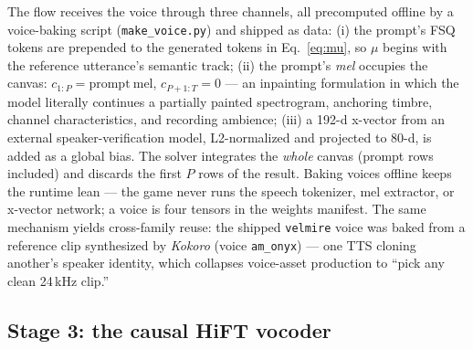 \documentclass[11pt,a4paper]{article}
\newcommand{\code}[1]{\texttt{#1}}
\begin{document}
The flow receives the voice through three channels, all precomputed offline by a
voice-baking script (\code{make\_voice.py}) and shipped as data: (i) the prompt's FSQ
tokens are prepended to the generated tokens in Eq.~\eqref{eq:mu}, so $\mu$ begins with
the reference utterance's semantic track; (ii) the prompt's \emph{mel} occupies the
canvas: $c_{1:P} = \mathrm{prompt\ mel}$, $c_{P+1:T} = 0$ --- an inpainting formulation
in which the model literally continues a partially painted spectrogram, anchoring
timbre, channel characteristics, and recording ambience; (iii) a 192-d x-vector from an
external speaker-verification model, L2-normalized and projected to 80-d, is added as a
global bias. The solver integrates the \emph{whole} canvas (prompt rows included) and
discards the first $P$ rows of the result. Baking voices offline keeps the runtime lean
--- the game never runs the speech tokenizer, mel extractor, or x-vector network; a
voice is four tensors in the weights manifest. The same mechanism yields cross-family
reuse: the shipped \code{velmire} voice was baked from a reference clip synthesized by
\emph{Kokoro} (voice \code{am\_onyx}) --- one TTS cloning another's speaker identity,
which collapses voice-asset production to ``pick any clean 24\,kHz clip.''

\subsection{Stage 3: the causal HiFT vocoder}
\label{sec:hift}
\end{document}
